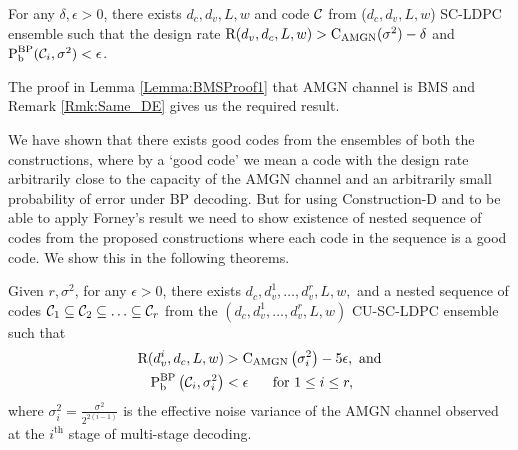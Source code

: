 \documentclass[journal,twocolumn]{IEEEtran}
\begin{document}
\begin{lemma}\label{Lemma:BMSProof2}
For any $\delta ,\epsilon>0$, there exists $d_{c},d_{v},L,w$ and code $\mathcal{C}$ from ($d_{c},d_{v},L,w$) SC-LDPC  ensemble such that the design rate $\text{R}(d_{v},d_{c},L,w)>\text{C}_{\text{AMGN}}(\sigma^{2})-\delta$ and $\text{P}_{\text{b}}^{\text{BP}}(\mathcal{C}_{i},\sigma^{2})< \epsilon$.

\end{lemma}
\begin{IEEEproof}
The proof in Lemma \ref{Lemma:BMSProof1} that AMGN channel is BMS and Remark \ref{Rmk:Same_DE} gives us the required result.
\end{IEEEproof}

We have shown that there exists good codes from the ensembles of both the constructions, where by a `good code' we mean a code with the design rate arbitrarily close to the capacity of the AMGN channel and an arbitrarily small probability of error under BP decoding. But for using Construction-D and to be able to apply Forney's result we need to show existence of nested sequence of codes from the proposed constructions where each code in the sequence is a good code. We show this in the following theorems.

\begin{lemma}\label{Lemma:NestedGoodCodes1}
Given $r,\sigma^{2}$, for any $\epsilon>0$, there exists $d_{c},d_{v}^{1},\ldots, d_{v}^{r},L,w,$ and a nested sequence of codes $\mathcal{C}_{1}\subseteq \mathcal{C}_{2}\subseteq\ldots \subseteq\mathcal{C}_{r}$ from the $(d_{c},d_{v}^{1},\ldots,d_{v}^{r},L,w)$ CU-SC-LDPC ensemble such that 
\begin{align}
\text{R}(d_{v}^{i},d_{c},L,w)&>\text{C}_{\text{AMGN}}\left(\sigma^{2}_{i}\right)-5\epsilon, \text{ and} \label{Eqn:RateConditions1}\\
\text{P}_{\text{b}}^{\text{BP}}\left(\mathcal{C}_{i},\sigma^{2}_{i}\right)&<\epsilon \hspace{0.5cm}\text{ for }1\leq i \leq r\label{Eqn:Error Prob1},
\end{align}
where $\sigma_{i}^{2}=\frac{\sigma^{2}}{2^{2(i-1)}}$ is the effective noise variance of the AMGN channel observed 	at the $i^{\text{th}}$ stage of multi-stage decoding.
\end{lemma}
\end{document}
